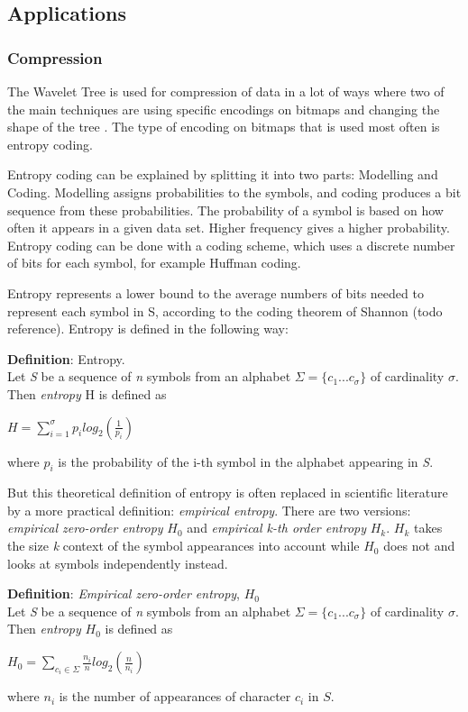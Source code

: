 \subsection{Applications}
\subsubsection{Compression}
The Wavelet Tree is used for compression of data in a lot of ways where two of the main techniques are using specific encodings on bitmaps and changing the shape of the tree \citep[Section~3]{Navjda13}.
The type of encoding on bitmaps that is used most often is entropy coding.

Entropy coding can be explained by splitting it into two parts: Modelling and Coding.
Modelling assigns probabilities to the symbols, and coding produces a bit sequence from these probabilities.
The probability of a symbol is based on how often it appears in a given data set. 
Higher frequency gives a higher probability.
Entropy coding can be done with a coding scheme, which uses a discrete number of bits for each symbol, for example Huffman coding. 

Entropy represents a lower bound to the average numbers of bits needed to represent each symbol in S, according to the coding theorem of Shannon (todo reference).
Entropy is defined in the following way:

\begin{mdframed}[nobreak, linecolor=lightgray]
\textbf{Definition}: Entropy. \\
Let \textit{S} be a sequence of \textit{n} symbols from an alphabet $\Sigma = \lbrace c_1 ... c_\sigma \rbrace$ of cardinality $\sigma$.
Then \textit{entropy} H is defined as
\begin{center}
$H = \sum_{i=1}^{\sigma} p_i log_2(\frac{1}{p_i})$
\end{center}
where $p_i$ is the probability of the i-th symbol in the alphabet appearing in \textit{S}. 
\end{mdframed}

But this theoretical definition of entropy is often replaced in scientific literature by a more practical definition: \textit{empirical entropy}.
There are two versions: \textit{empirical zero-order entropy} $H_0$ and \textit{empirical k-th order entropy} $H_k$. $H_k$ takes the size \textit{k} context of the symbol appearances into account while $H_0$ does not and looks at symbols independently instead. 

\begin{mdframed}[nobreak, linecolor=lightgray]
\textbf{Definition}: \textit{Empirical zero-order entropy}, $H_0$ \\
Let \textit{S} be a sequence of \textit{n} symbols from an alphabet $\Sigma = \lbrace c_1 ... c_\sigma \rbrace$ of cardinality $\sigma$.
Then \textit{entropy} $H_0$ is defined as
\begin{center}
$H_0 = \sum_{c_i \in \Sigma} \frac{n_i}{n} log_2(\frac{n}{n_i})$
\end{center}
where $n_i$ is the number of appearances of character $c_i$ in $S$.
\end{mdframed}

